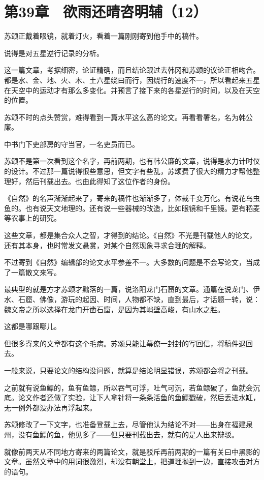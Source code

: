 \section{第39章　欲雨还晴咨明辅（12）}

苏颂正戴着眼镜，就着灯火，看着一篇刚刚寄到他手中的稿件。

说得是对五星逆行记录的分析。

这一篇文章，考据细密，论证精确，而且结论跟过去韩冈和苏颂的议论正相吻合。都是水、金、地、火、木、土六星绕曰而行，因绕行的速度不一，所以看起来五星在天空中的运动才有那么多变化。并预言了接下来的各星逆行的时间，以及在天空的位置。

苏颂不时的点头赞赏，难得看到一篇水平这么高的论文。再看看署名，名为韩公廉。

中书门下吏部房的守当官，一名吏员而已。

苏颂不是第一次看到这个名字，再前两期，也有韩公廉的文章，说得是水力计时仪的设计。不过那一篇说得很些意思，但文字有些乱，苏颂费了很大的精力才帮他整理好，然后刊载出去。也由此得知了这位作者的身份。

《自然》的名声渐渐起来了，寄来的稿件也渐渐多了，体裁千变万化。有说花鸟虫鱼的。也有说天文地理的。还有说一些器械的改造，比如眼镜和千里镜。更有稻麦等农事上的研究。

这些文章，都是集合众人之智，才得到的结论。《自然》不光是刊载他人的论文，还有其本身，也时常发文悬赏，对某个自然现象寻求合理的解释。

不过寄到《自然》编辑部的论文水平参差不一。大多数的问题是不会写论文，当成了一篇散文来写。

最典型的就是方才苏颂才黜落的一篇，说洛阳龙门石窟的文章。通篇在说龙门、伊水、石窟、佛像，游玩的起因、时间，人物都不缺，直到最后，才话题一转，说：魏文帝之所以选择在龙门开凿石窟，是因为其峭壁高峻，有山水之胜。

这都是哪跟哪儿。

但很多寄来的文章都有这个毛病。苏颂只能让幕僚一封封的写回信，将稿件退回去。

一般来说，只要论文的结构没问题，就算是结论明显错误，苏颂都会将之刊载。

之前就有说鱼鳔的，鱼有鱼鳔，所以吞气可浮，吐气可沉，若鱼鳔破了，鱼就会沉底。论文作者还做了实验，让下人拿针将一条条活鱼的鱼鳔戳破，然后丢进水缸，无一例外都没办法再浮起来。

苏颂修改了一下文字，也准备登载上去，尽管他认为结论不对——出身在福建泉州，没有鱼鳔的鱼，他见多了——但只要刊载出去，就有的是人出来辩驳。

就像前两天从不同地方寄来的两篇论文，就是驳斥再前两期的一篇有关曰中黑影的文章。虽然文章中的用词很激烈，却没有朝堂上，把道理抛到一边，直接攻击对方的语句。


